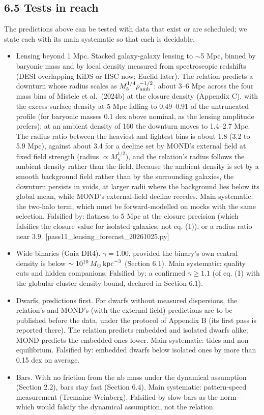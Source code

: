 \documentclass[
  10pt,
]{article}
\begin{document}
\subsection{6.5 Tests in reach}

The predictions above can be tested with data that exist or are scheduled; we state each with its main systematic so that each is decidable.
\begin{itemize}
\item[(i)] Lensing beyond 1 Mpc. Stacked galaxy-galaxy lensing to $\sim$5 Mpc, binned by baryonic mass and by local density measured from spectroscopic redshifts (DESI overlapping KiDS or HSC now; Euclid later). The relation predicts a downturn whose radius scales as $M_b^{1/4}\rho_{\rm amb}^{-1/2}$: about 3--6 Mpc across the four mass bins of Mistele et al.~(2024b) at the closure density (Appendix C), with the excess surface density at 5 Mpc falling to 0.49--0.91 of the untruncated profile (for baryonic masses 0.1 dex above nominal, as the lensing amplitude prefers); at an ambient density of 160 the downturn moves to 1.4--2.7 Mpc. The radius ratio between the heaviest and lightest bins is about 1.8 (3.2 to 5.9 Mpc), against about 3.4 for a decline set by MOND's external field at fixed field strength (radius $\propto M_b^{1/2}$), and the relation's radius follows the ambient density rather than the field. Because the ambient density is set by a smooth background field rather than by the surrounding galaxies, the downturn persists in voids, at larger radii where the background lies below its global mean, while MOND's external-field decline recedes. Main systematic: the two-halo term, which must be forward-modelled on mocks with the same selection. Falsified by: flatness to 5 Mpc at the closure precision (which falsifies the closure value for isolated galaxies, not eq. (1)), or a radius ratio near 3.9. {[}pass11\_lensing\_forecast\_20261025.py{]}
\item[(ii)] Wide binaries (Gaia DR4). $\gamma=1.00$, provided the binary's own central density is below $\sim10^{10}\,M_\odot\,{\rm kpc}^{-3}$ (Section 6.1). Main systematic: quality cuts and hidden companions. Falsified by: a confirmed $\gamma\ge1.1$ (of eq. (1) with the globular-cluster density bound, declared in Section 6.1).
\item[(iii)] Dwarfs, predictions first. For dwarfs without measured dispersions, the relation's and MOND's (with the external field) predictions are to be published before the data, under the protocol of Appendix B (its first pass is reported there). The relation predicts embedded and isolated dwarfs alike; MOND predicts the embedded ones lower. Main systematic: tides and non-equilibrium. Falsified by: embedded dwarfs below isolated ones by more than 0.15 dex on average.
\item[(iv)] Bars. With no friction from the nb mass under the dynamical assumption (Section 2.2), bars stay fast (Section 6.4). Main systematic: pattern-speed measurement (Tremaine-Weinberg). Falsified by slow bars as the norm -- which would falsify the dynamical assumption, not the relation.
\end{itemize}
\end{document}
